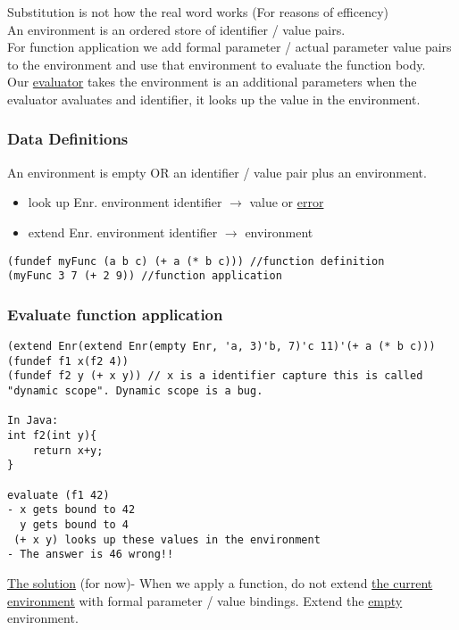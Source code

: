 \documentclass{article}
\begin{document}
\begin{flushleft}
Substitution is not how the real word works (For reasons of efficency)\\
An environment is an ordered store of identifier / value pairs.\\
For function application we add formal parameter / actual parameter value pairs to the environment and use that environment to evaluate the function body.\\
Our \underline{evaluator} takes the environment is an additional parameters when the evaluator avaluates and identifier, it looks up the value in the environment.
\end{flushleft}

\subsubsection*{Data Definitions}
An environment is empty OR an identifier / value pair plus an environment.
\begin{itemize}
\item look up Enr. environment identifier $\rightarrow$ value or \underline{error}
\item extend Enr. environment identifier $\rightarrow$ environment
\end{itemize}
\begin{verbatim}
(fundef myFunc (a b c) (+ a (* b c))) //function definition
(myFunc 3 7 (+ 2 9)) //function application
\end{verbatim}

\subsubsection*{Evaluate function application}
\begin{verbatim}
(extend Enr(extend Enr(empty Enr, 'a, 3)'b, 7)'c 11)'(+ a (* b c)))
(fundef f1 x(f2 4))
(fundef f2 y (+ x y)) // x is a identifier capture this is called "dynamic scope". Dynamic scope is a bug.

In Java: 
int f2(int y){
	return x+y;
}

evaluate (f1 42) 
- x gets bound to 42
  y gets bound to 4
 (+ x y) looks up these values in the environment
- The answer is 46 wrong!!
\end{verbatim}

\begin{flushleft}
\underline{The solution} (for now)- When we apply a function, do not extend \underline{the current environment} with formal parameter / value bindings. Extend the \underline{empty} environment.
\end{flushleft}
\end{document}
